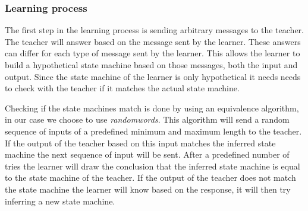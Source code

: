 \subsubsection{Learning process}

The first step in the learning process is sending arbitrary messages to the teacher. The teacher will answer based on the message sent by the learner. These answers can differ for each type of message sent by the learner. This allows the learner to build a hypothetical state machine based on those messages, both the input and output.
Since the state machine of the learner is only hypothetical it needs needs to check with the teacher if it matches the actual state machine.

Checking if the state machines match is done by using an equivalence algorithm, in our case we choose to use \emph{randomwords}. This algorithm will send a random sequence of inputs of a predefined minimum and maximum length to the teacher. If the output of the teacher based on this input matches the inferred state machine the next sequence of input will be sent. After a predefined number of tries the learner will draw the conclusion that the inferred state machine is equal to the state machine of the teacher. If the output of the teacher does not match the state machine the learner will know based on the response, it will then try inferring a new state machine.

